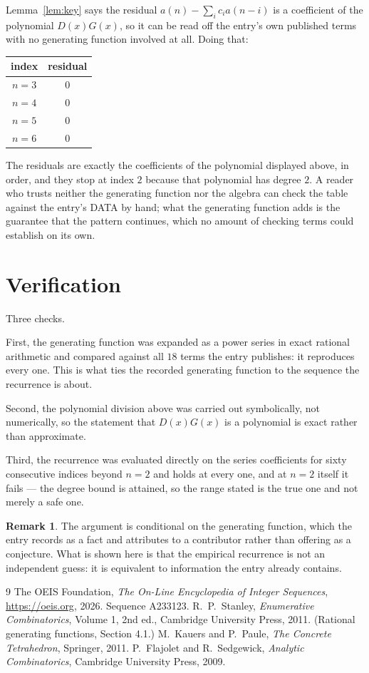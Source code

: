 \documentclass[11pt,a4paper]{article}
\theoremstyle{plain}
\theoremstyle{definition}
\newtheorem{remark}[theorem]{Remark}
\begin{document}
Lemma~\ref{lem:key} says the residual $a(n)-\sum_ic_ia(n-i)$ is a coefficient of the
polynomial $D(x)G(x)$, so it can be read off the entry's own published terms with no
generating function involved at all. Doing that:
\begin{center}
\begin{tabular}{cc}
index & residual \\ \hline
$n=3$ & $0$ \\
$n=4$ & $0$ \\
$n=5$ & $0$ \\
$n=6$ & $0$
\end{tabular}
\end{center}
The residuals are exactly the coefficients of the polynomial displayed above, in order, and
they stop at index $2$ because that polynomial has degree $2$. A reader who trusts
neither the generating function nor the algebra can check the table against the entry's DATA
by hand; what the generating function adds is the guarantee that the pattern continues, which
no amount of checking terms could establish on its own.

\section{Verification}

Three checks.

First, the generating function was expanded as a power series in exact rational arithmetic and
compared against all $18$ terms the entry publishes: it reproduces every one. This is
what ties the recorded generating function to the sequence the recurrence is about.

Second, the polynomial division above was carried out symbolically, not numerically, so the
statement that $D(x)G(x)$ is a polynomial is exact rather than approximate.

Third, the recurrence was evaluated directly on the series coefficients for sixty consecutive
indices beyond $n=2$ and holds at every one, and at $n=2$ itself it fails --- the
degree bound is attained, so the range stated is the true one and not merely a safe one.

\begin{remark}
The argument is conditional on the generating function, which the entry records as a fact and
attributes to a contributor rather than offering as a conjecture. What is shown here is that
the empirical recurrence is not an independent guess: it is equivalent to information the
entry already contains.
\end{remark}

\begin{thebibliography}{9}
 The OEIS Foundation, \emph{The On-Line Encyclopedia of Integer
Sequences}, \url{https://oeis.org}, 2026. Sequence A233123.
 R.~P.~Stanley, \emph{Enumerative Combinatorics}, Volume 1, 2nd ed.,
Cambridge University Press, 2011. (Rational generating functions, Section 4.1.)
 M.~Kauers and P.~Paule, \emph{The Concrete Tetrahedron}, Springer, 2011.
 P.~Flajolet and R.~Sedgewick, \emph{Analytic Combinatorics}, Cambridge
University Press, 2009.
\end{thebibliography}
\end{document}
